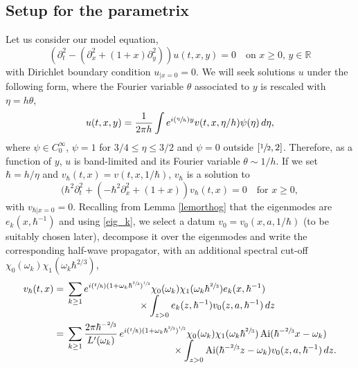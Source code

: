 \documentclass[11pt]{article}
\newcommand{\Psfrac}[2]{(\sfrac{#1}{#2})}
\DeclareMathOperator{\Ai}{Ai}
\theoremstyle{plain}
\theoremstyle{definition}
\begin{document}
\subsection{Setup for the parametrix}
Let us consider our model equation,
\begin{equation*}
\label{eq:42}
(\partial^{2}_{t} -(\partial^{2}_{x}+(1+x)\partial^{2}_{y})) u(t,x,y)=0 \quad\text{on } x\geq 0, \,y\in\mathbb{R}
\end{equation*}
with Dirichlet boundary condition $u_{|x=0}=0$. We will seek solutions $u$ under the following form, where the Fourier variable $\theta$ associated to $y$ is rescaled with $\eta=h\theta$,
\begin{equation*}
\label{eq:43}
u(t,x,y)=\frac 1{2\pi h} \int e^{i\Psfrac \eta h y} v(t,x,\eta/h) \psi(\eta)\,d\eta,
\end{equation*}
where $\psi\in C^{\infty}_{0}$, $\psi=1$ for $3/4\leq \eta\leq 3/2$ and $\psi=0$ outside $[\sfrac 12,2]$. Therefore, as a function of $y$, $u$ is band-limited and its Fourier variable $\theta\sim 1/h$. If we set $\hbar=h/\eta$ and $v_{\hbar}(t,x)=v(t,x,1/\hbar)$, $v_{\hbar}$ is a solution to
\begin{equation*}
\label{eq:44}
(\hbar^{2}\partial^{2}_{t}+(-\hbar^{2}\partial^{2}_{x}+(1+x)) v_{\hbar}(t,x)=0 \quad\text{for } x\geq 0,
\end{equation*}
with $v_{\hbar|x=0}=0$.
Recalling from Lemma \ref{lemorthog} that the eigenmodes are $e_{k}(x,\hbar^{-1})$ and using \eqref{eig_k}, we select a datum $v_{0}=v_{0}(x,a,1/\hbar)$ (to be suitably chosen later), decompose it over the eigenmodes and write the corresponding half-wave propagator, with an additional spectral cut-off $\chi_{0}(\omega_{k}) \chi_{1}(\omega_{k}\hbar^{2/3})$,
\begin{equation}
\label{eq:46}
\begin{split}
v_{\hbar}(t,x) & = \begin{multlined}[t] \sum_{k\geq 1} e^{i\Psfrac t \hbar (1+\omega_{k} \hbar^{\sfrac 23})^{\sfrac 1 2}} \chi_{0}(\omega_{k})\chi_{1}(\omega_{k}\hbar^{\sfrac 23}) e_{k} (x,\hbar^{-1}) \\[
-3pt] \times \int_{{z}>0} e_{k}({z},\hbar^{-1}) v_{0}({z},a,\hbar^{-1}) \,d{z}
\end{multlined}\\
& = \begin{multlined}[t] \sum_{k\geq 1} \frac{2\pi \hbar^{-\sfrac 23} }{L'(\omega_{k})}\, e^{i\Psfrac t \hbar (1+\omega_{k} \hbar^{\sfrac 23})^{\sfrac 1 2}} \chi_{0}(\omega_{k})\chi_{1}(\omega_{k}\hbar^{\sfrac 23}) \Ai(\hbar^{-\sfrac 23} x-\omega_{k})\\[
-3pt] \times \int_{{z}>0} \Ai(\hbar^{-\sfrac 23} {z}-\omega_{k}) v_{0}({z},a,\hbar^{-1}) \,d{z}.\end{multlined}
\end{split}
\end{equation}
\end{document}
